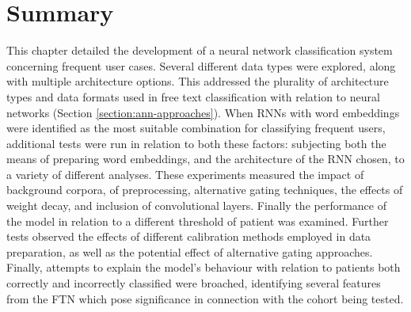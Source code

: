 \section{Summary}

This chapter detailed the development of a neural network classification system concerning frequent user cases. Several different data types were explored, along with multiple architecture options. This addressed the plurality of architecture types and data formats used in free text classification with relation to neural networks (Section \ref{section:ann-approaches}). When RNNs with word embeddings were identified as the most suitable combination for classifying frequent users, additional tests were run in relation to both these factors: subjecting both the means of preparing word embeddings, and the architecture of the RNN chosen, to a variety of different analyses. These experiments measured the impact of background corpora, of preprocessing, alternative gating techniques, the effects of weight decay, and inclusion of convolutional layers. Finally the performance of the model in relation to a different threshold of patient was examined.  Further tests observed the effects of different calibration methods employed in data preparation, as well as the potential effect of alternative gating approaches. Finally, attempts to explain the model's behaviour with relation to patients both correctly and incorrectly classified were broached, identifying several features from the FTN which pose significance in connection with the cohort being tested.   

